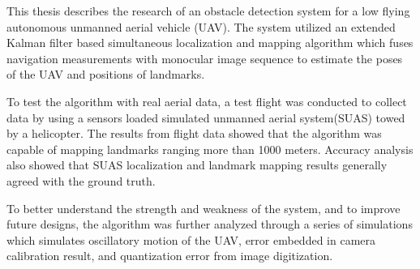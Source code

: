 
This thesis describes the research of an obstacle detection system for a low flying
autonomous unmanned aerial vehicle (UAV). The system utilized an
extended Kalman filter based simultaneous localization and mapping
algorithm which fuses navigation measurements with
monocular image sequence to estimate the poses of the UAV and positions
of landmarks.

To test the algorithm with real aerial data, a test flight was conducted to
collect data by using a sensors loaded simulated unmanned aerial system(SUAS) towed
by a helicopter. 
The results from flight
data showed that the algorithm was capable of mapping
landmarks ranging more than 1000 meters. Accuracy analysis also showed that SUAS localization and landmark mapping
results generally agreed with the ground truth. 

To better understand the strength and weakness of
the system, and to improve future designs, the
algorithm was further analyzed through a series of simulations which simulates oscillatory motion of the UAV, error embedded in camera calibration result, and quantization error from image digitization.
